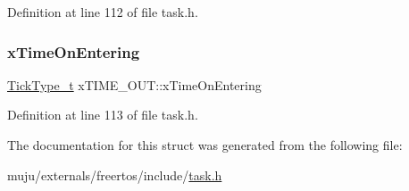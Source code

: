 Definition at line 112 of file task.\+h.

\mbox{\label{structx_t_i_m_e___o_u_t_a3464939ca050f7bcc6ffe0d8d3766337}} 
\subsubsection{\texorpdfstring{x\+Time\+On\+Entering}{xTimeOnEntering}}
{\footnotesize\ttfamily \hyperlink{externals_2freertos_2portable_2_g_c_c_2_a_r_m___c_m0_2portmacro_8h_aa69c48c6e902ce54f70886e6573c92a9}{Tick\+Type\+\_\+t} x\+T\+I\+M\+E\+\_\+\+O\+U\+T\+::x\+Time\+On\+Entering}



Definition at line 113 of file task.\+h.



The documentation for this struct was generated from the following file\+:\begin{DoxyCompactItemize}
\item 
muju/externals/freertos/include/\hyperlink{externals_2freertos_2include_2task_8h}{task.\+h}\end{DoxyCompactItemize}
